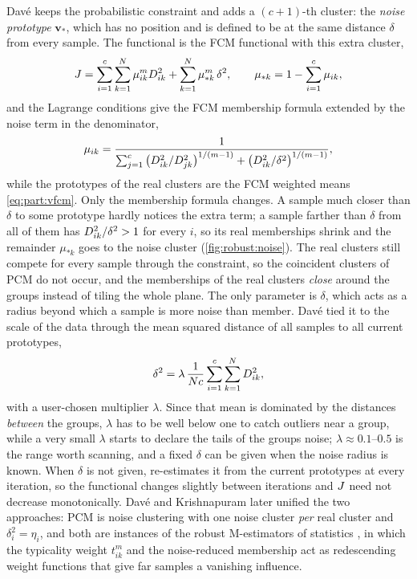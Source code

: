 Davé \cite{dave:1991:noise} keeps the probabilistic constraint and adds a $(c+1)$-th cluster: the \emph{noise prototype} $\mathbf{v}_*$, which has no position and is defined to be at the same distance $\delta$ from every sample. The functional is the FCM functional with this extra cluster,
\begin{equation}
  J=\sum_{i=1}^{c}\sum_{k=1}^{N}\mu_{ik}^mD^2_{ik}+\sum_{k=1}^{N}\mu_{*k}^m\,\delta^2,\qquad
  \mu_{*k}=1-\sum_{i=1}^{c}\mu_{ik} ,
  \label{eq:robust:Jnc}
\end{equation}
and the Lagrange conditions give the FCM membership formula extended by the noise term in the denominator,
\begin{equation}
  \mu_{ik}=\frac{1}{\sum_{j=1}^{c}\big(D^2_{ik}/D^2_{jk}\big)^{1/(m-1)}+\big(D^2_{ik}/\delta^2\big)^{1/(m-1)}},
  \label{eq:robust:munc}
\end{equation}
while the prototypes of the real clusters are the FCM weighted means \eqref{eq:part:vfcm}. Only the membership formula changes. A sample much closer than $\delta$ to some prototype hardly notices the extra term; a sample farther than $\delta$ from all of them has $D^2_{ik}/\delta^2>1$ for every $i$, so its real memberships shrink and the remainder $\mu_{*k}$ goes to the noise cluster (\cref{fig:robust:noise}). The real clusters still compete for every sample through the constraint, so the coincident clusters of PCM do not occur, and the memberships of the real clusters \emph{close} around the groups instead of tiling the whole plane. The only parameter is $\delta$, which acts as a radius beyond which a sample is more noise than member. Davé tied it to the scale of the data through the mean squared distance of all samples to all current prototypes,
\begin{equation}
  \delta^2=\lambda\,\frac{1}{Nc}\sum_{i=1}^{c}\sum_{k=1}^{N}D^2_{ik} ,
  \label{eq:robust:delta}
\end{equation}
with a user-chosen multiplier $\lambda$. Since that mean is dominated by the distances \emph{between} the groups, $\lambda$ has to be well below one to catch outliers near a group, while a very small $\lambda$ starts to declare the tails of the groups noise; $\lambda\approx0.1$--$0.5$ is the range worth scanning, and a fixed $\delta$ can be given when the noise radius is known. When $\delta$ is not given,  re-estimates it from the current prototypes at every iteration, so the functional changes slightly between iterations and $J$ need not decrease monotonically. Davé and Krishnapuram \cite{dave:1997:robust} later unified the two approaches: PCM is noise clustering with one noise cluster \emph{per} real cluster and $\delta_i^2=\eta_i$, and both are instances of the robust M-estimators of statistics \cite{huber:1981:robust}, in which the typicality weight $t_{ik}^m$ and the noise-reduced membership act as redescending weight functions that give far samples a vanishing influence.

